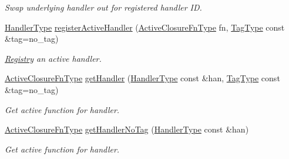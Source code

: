 \begin{DoxyCompactItemize}
\begin{DoxyCompactList}\small\item\em Swap underlying handler out for registered handler ID. \end{DoxyCompactList}\item 
\hyperlink{namespacevt_af64846b57dfcaf104da3ef6967917573}{Handler\+Type} \hyperlink{structvt_1_1registry_1_1_registry_ad4fdbf2cfbe4e852c5556435efe4255f}{register\+Active\+Handler} (\hyperlink{namespacevt_a2a06c34cafcd511828f16cbf1476b924}{Active\+Closure\+Fn\+Type} fn, \hyperlink{namespacevt_a84ab281dae04a52a4b243d6bf62d0e52}{Tag\+Type} const \&tag=no\+\_\+tag)
\begin{DoxyCompactList}\small\item\em \hyperlink{structvt_1_1registry_1_1_registry}{Registry} an active handler. \end{DoxyCompactList}\item 
\hyperlink{namespacevt_a2a06c34cafcd511828f16cbf1476b924}{Active\+Closure\+Fn\+Type} \hyperlink{structvt_1_1registry_1_1_registry_a7ed0804483b7a1816b8b05429668f6c9}{get\+Handler} (\hyperlink{namespacevt_af64846b57dfcaf104da3ef6967917573}{Handler\+Type} const \&han, \hyperlink{namespacevt_a84ab281dae04a52a4b243d6bf62d0e52}{Tag\+Type} const \&tag=no\+\_\+tag)
\begin{DoxyCompactList}\small\item\em Get active function for handler. \end{DoxyCompactList}\item 
\hyperlink{namespacevt_a2a06c34cafcd511828f16cbf1476b924}{Active\+Closure\+Fn\+Type} \hyperlink{structvt_1_1registry_1_1_registry_ae258a38c9a8237c900ecd40f3a4328d9}{get\+Handler\+No\+Tag} (\hyperlink{namespacevt_af64846b57dfcaf104da3ef6967917573}{Handler\+Type} const \&han)
\begin{DoxyCompactList}\small\item\em Get active function for handler. \end{DoxyCompactList}\end{DoxyCompactItemize}
